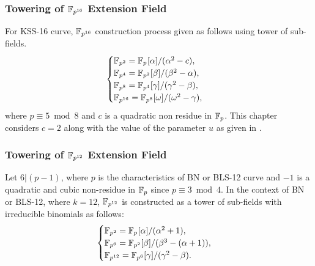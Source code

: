 \subsubsection{Towering of \texorpdfstring{$\mathbb{F}_{p^{16}}$}{} Extension Field}
For KSS-16 curve, $\mathbb{F}_{p^{16}}$ construction process given as follows using tower of sub-fields. 
\begin{equation}\label{towering}
\begin{cases}
{\mathbb{F}}_{p^{2}} = {\mathbb{F}}_{p^{}}[\alpha]/(\alpha^2-c),  \\ 
{\mathbb{F}}_{p^{4}} = {\mathbb{F}}_{p^{2}}[\beta]/(\beta^2-\alpha),  \\ 
{\mathbb{F}}_{p^{8}} = {\mathbb{F}}_{p^{4}}[\gamma]/(\gamma^2-\beta), \\ 
{\mathbb{F}}_{p^{16}} = {\mathbb{F}}_{p^{8}}[\omega]/(\omega^2-\gamma), \\ 
\end{cases}
\end{equation}
where  $p \equiv 5 \bmod 8$  and $c$ is a quadratic non residue in ${\mathbb{F}}_{p}$. This chapter considers  $c = 2$ along with the value of 
the parameter $u$ as given in \cite{EPRINT:BarDuq17}. 

\subsubsection{Towering of \texorpdfstring{$\mathbb{F}_{p^{12}}$}{} Extension Field}
Let $6|(p-1)$, where $p$ is the characteristics of BN or BLS-12 curve and $-1$ is a quadratic and cubic non-residue in ${\mathbb{F}}_{p}$ since $p \equiv 3 \bmod 4$. 
In the context of BN or BLS-12, where $k=12$, $\mathbb{F}_{p^{12}}$ is constructed as  a tower of sub-fields with irreducible binomials as follows:
\begin{equation}\label{BN_towering}
\begin{cases}
{\mathbb{F}}_{p^{2}} = {\mathbb{F}}_{p^{}}[\alpha]/(\alpha^2+1),  \\ 
{\mathbb{F}}_{p^{6}} = {\mathbb{F}}_{p^{2}}[\beta]/(\beta^3-(\alpha+1)),  \\ 
{\mathbb{F}}_{p^{12}} = {\mathbb{F}}_{p^{6}}[\gamma]/(\gamma^2-\beta). \\ 
\end{cases}
\end{equation}

